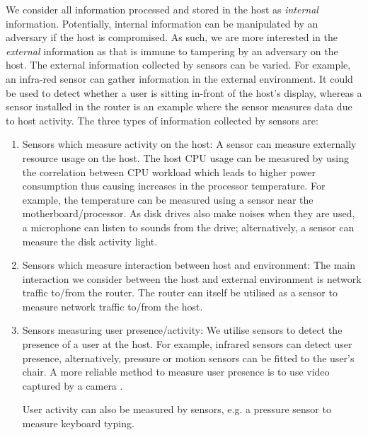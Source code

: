 We consider all information processed and stored in the host as {\em
internal} information.
Potentially, internal information
can be manipulated by an adversary if the host is
compromised.
As such, we are more interested in the {\em external} information
as that is immune to tampering by an adversary on the host.
The external information collected by sensors can be varied.
For example, an infra-red sensor can gather information in the
external environment. It could be used to detect whether
a user is sitting in-front of the host's display,
whereas a sensor installed in the router is an example where the sensor
measures data due to host activity.
The three types of information collected by sensors are:
\begin{enumerate}
\item Sensors which measure activity on the host:
A sensor can measure externally resource usage on the host.
The host CPU usage can be measured by using the correlation between
CPU workload which leads to higher power consumption thus causing
increases in the processor temperature.
For example, the temperature can be
measured using a sensor near the motherboard/processor.
As disk drives also make noises when they are used,
a microphone can listen to sounds from the drive; alternatively,
a sensor can measure the disk activity light.

\item Sensors which measure interaction between host and environment:
The main interaction we consider between the host and external environment
is network traffic to/from the router.
The router can itself be utilised as a sensor to measure network traffic
to/from the host.

\item Sensors measuring user presence/activity:
We utilise sensors to detect the presence of a user at the host.
For example, infrared sensors can detect user presence,
alternatively, pressure or motion sensors can be fitted to the user's chair.
A more reliable method to measure user presence is to use
video captured by a camera \cite{biomon,biomon2}.

User activity can also be measured by sensors, e.g.
a pressure sensor to measure keyboard typing.
\end{enumerate}

